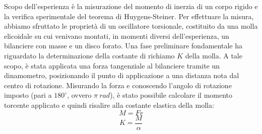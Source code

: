 Scopo dell'esperienza è la misurazione del momento di inerzia di un corpo rigido e la verifica sperimentale del teorema di Huygens-Steiner. Per effettuare la misura, abbiamo sfruttato le proprietà di un oscillatore torsionale, costituito da una molla elicoidale su cui venivano montati, in momenti diversi dell'esperienza, un bilanciere con masse e un disco forato. Una fase preliminare fondamentale ha riguardato la determinazione della costante di richiamo $K$ della molla. A tale scopo, è stata applicata una forza tangenziale al bilanciere tramite un dinamometro, posizionando il punto di applicazione a una distanza nota dal centro di rotazione. Misurando la forza e conoscendo l'angolo di rotazione imposto (pari a $180^{\circ}$, ovvero $\pi \ rad$), è stato possibile calcolare il momento torcente applicato e quindi risalire alla costante elastica della molla:
\begin{equation}
	M = Fr
\end{equation}
\begin{equation}
	K=\frac{M}{\alpha}
\end{equation}
